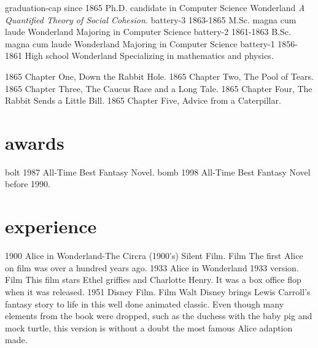 \documentclass[icon]{twentysecondcv}
\begin{document}
\begin{twentyicon}
  \twentyitemicon
    {graduation-cap}
    {since 1865}
    {Ph.D. {\normalfont candidate in Computer Science}}
    {Wonderland}
    {\emph{A Quantified Theory of Social Cohesion.}}
  \twentyitemicon
    {battery-3}
    {1863-1865}
    {M.Sc. magna cum laude}
    {Wonderland}
    {Majoring in Computer Science}
  \twentyitemicon
    {battery-2}
    {1861-1863}
    {B.Sc. magna cum laude}
    {Wonderland}
    {Majoring in Computer Science}
  \twentyitemicon
    {battery-1}
    {1856-1861}
    {High school}
    {Wonderland}
    {Specializing in mathematics and physics.}
\end{twentyicon}

\begin{twentyshort}
  \twentyitemshort
    {1865}
    {Chapter One, Down the Rabbit Hole.}
  \twentyitemshort
    {1865}
    {Chapter Two, The Pool of Tears.}
  \twentyitemshort
    {1865}
    {Chapter Three,  The Caucus Race and a Long Tale.}
  \twentyitemshort
    {1865}
    {Chapter Four,  The Rabbit Sends a Little Bill.}
  \twentyitemshort
    {1865}
    {Chapter Five,  Advice from a Caterpillar.}
\end{twentyshort}

\section{awards}
\begin{twentyshorticon}
  \twentyitemshorticon
    {bolt}
    {1987}
    {All-Time Best Fantasy Novel.}
  \twentyitemshorticon
    {bomb}
    {1998}
    {All-Time Best Fantasy Novel before 1990.}
\end{twentyshorticon}

\section{experience}
\begin{twenty}
  \twentyitem
    {1900}
    {Alice in Wonderland-The Circra (1900's) Silent Film.}
    {Film}
    {The first Alice on film was over a hundred years ago.}
  \twentyitem
    {1933}
    {Alice in Wonderland 1933 version.}
    {Film}
    {This film stars Ethel griffies and Charlotte Henry. It was a box office flop when it was released.}
\twentyitem
    {1951}
    {Disney Film.}
    {Film}
    {Walt Disney brings Lewis Carroll's fantasy story to life in this well done animated classic. Even though many elements from the book were dropped, such as the duchess with the baby pig and mock turtle, this version is without a doubt the most famous Alice adaption made.}
\end{twenty}
\end{document}

